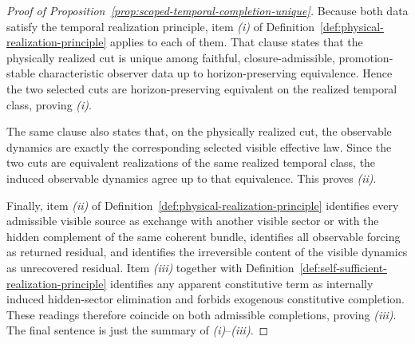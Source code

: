 \begin{proof}[Proof of Proposition~\ref{prop:scoped-temporal-completion-unique}]
\label{proof:prop:scoped-temporal-completion-unique}
Because both data satisfy the temporal realization principle, item
\emph{(i)} of Definition~\ref{def:physical-realization-principle} applies to
each of them. That clause states that the physically realized cut is unique
among faithful, closure-admissible, promotion-stable characteristic observer
data up to horizon-preserving equivalence. Hence the two selected cuts are
horizon-preserving equivalent on the realized temporal class, proving
\emph{(i)}.

The same clause also states that, on the physically realized cut, the
observable dynamics are exactly the corresponding selected visible effective
law. Since the two cuts are equivalent realizations of the same realized
temporal class, the induced observable dynamics agree up to that equivalence.
This proves \emph{(ii)}.

Finally, item \emph{(ii)} of
Definition~\ref{def:physical-realization-principle} identifies every
admissible visible source as exchange with another visible sector or with the
hidden complement of the same coherent bundle, identifies all observable
forcing as returned residual, and identifies the irreversible content of the
visible dynamics as unrecovered residual. Item \emph{(iii)} together with
Definition~\ref{def:self-sufficient-realization-principle} identifies any
apparent constitutive term as internally induced hidden-sector elimination and
forbids exogenous constitutive completion. These readings therefore coincide on
both admissible completions, proving \emph{(iii)}. The final sentence is just
the summary of \emph{(i)}--\emph{(iii)}.
\end{proof}

